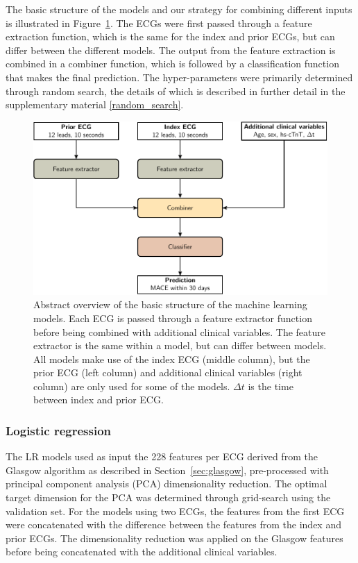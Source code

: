 \documentclass[preprint]{elsarticle}
\begin{document}
The basic structure of the models and our strategy for combining different inputs is illustrated in Figure~\ref{fig:model:overview}. The ECGs were first passed through a feature extraction function, which is the same for the index and prior ECGs, but can differ between the different models. The output from the feature extraction is combined in a combiner function, which is followed by a classification function that makes the final prediction. The hyper-parameters were primarily determined through random search, the details of which is described in further detail in the supplementary material \ref{random_search}.

\begin{figure}[h!]
\includegraphics[width=\linewidth]{figures/overview.pdf}
\centering
\caption{Abstract overview of the basic structure of the machine learning models. Each ECG is passed through a feature extractor function before being combined with additional clinical variables. The feature extractor is the same within a model, but can differ between models. All models make use of the index ECG (middle column), but the prior ECG (left column) and additional clinical variables (right column) are only used for some of the models. $\Delta t$ is the time between index and prior ECG.}
\label{fig:model:overview}
\end{figure}

\subsubsection{Logistic regression}
The LR models used as input the 228 features per ECG derived from the Glasgow algorithm as described in Section~\ref{sec:glasgow}, pre-processed with principal component analysis (PCA) dimensionality reduction. The optimal target dimension for the PCA was determined through grid-search using the validation set. For the models using two ECGs, the features from the first ECG were concatenated with the difference between the features from the index and prior ECGs. The dimensionality reduction was applied on the Glasgow features before being concatenated with the additional clinical variables.
\end{document}
